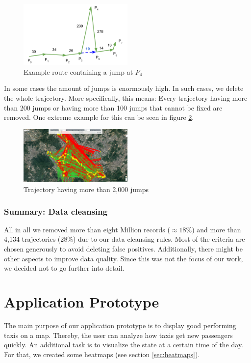 \documentclass[10pt]{sig-alternate}
\begin{document}
\begin{figure}[ht]
\centering
\includegraphics[width=0.5\textwidth]{img/jumps.png}
\caption{Example route containing a jump at $P_4$}
\label{fig:jump}
\end{figure}

In some cases the amount of jumps is enormously high. In such cases, we delete the whole trajectory. More specifically, this means: Every trajectory having more than 200 jumps or having more than 100 jumps that cannot be fixed are removed. One extreme example for this can be seen in figure \ref{fig:more_jumps}.

\begin{figure}[ht]
\centering
\includegraphics[width=0.5\textwidth]{img/more_jumps.png}
\caption{Trajectory \textit{} having more than 2,000 jumps}
\label{fig:more_jumps}
\end{figure}

\subsubsection{Summary: Data cleansing}
All in all we removed more than eight Million records ($\approx 18\%$) and more than 4,134 trajectories ($28\%$) due to our data cleansing rules. Most of the criteria are chosen generously to avoid deleting false positives. Additionally, there might be other aspects to improve data quality. Since this was not the focus of our work, we decided not to go further into detail.

\section{Application Prototype}

The main purpose of our application prototype is to display good performing taxis on a map. Thereby, the user can analyze how taxis get new passengers quickly. An additional task is to visualize the state at a certain time of the day. For that, we created some heatmaps (see section \ref{sec:heatmaps}).
\end{document}
